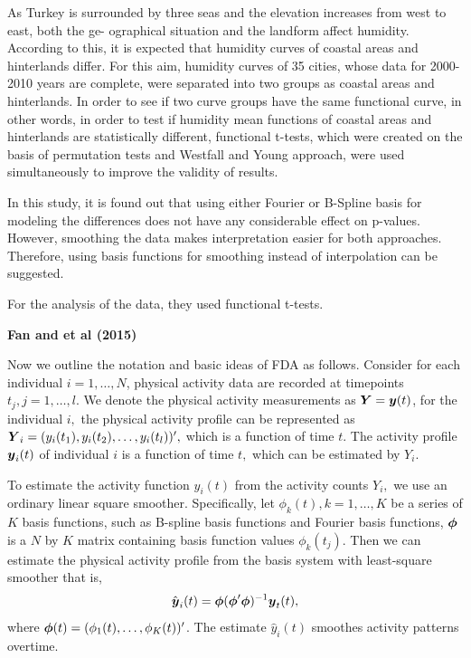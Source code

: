 \documentclass[12pt]{article}
\newcommand{\bphi}{\mbox{\boldmath$\phi$}}
\newcommand{\by}{\mbox{\boldmath$y$}}
\newcommand{\bY}{\mbox{\boldmath$Y$}}
\begin{document}
    As Turkey is surrounded by three seas and the elevation increases from west to east,
    both the ge- ographical situation and the landform affect humidity. According to this,
    it is expected that humidity curves of coastal areas and hinterlands differ. For this aim,
    humidity curves of 35 cities, whose data for 2000-2010 years are complete, were separated
    into two groups as coastal areas and hinterlands. In order to see if two curve groups have
    the same functional curve, in other words, in order to test if humidity mean functions of
    coastal areas and hinterlands are statistically different, functional t-tests, which were
    created on the basis of permutation tests and Westfall and Young approach, were used
    simultaneously to improve the validity of results.

    In this study, it is found out that using either Fourier or B-Spline basis for modeling the
     differences does not have any considerable effect on p-values. However, smoothing the data
     makes interpretation easier for both approaches. Therefore, using basis functions for
     smoothing instead of interpolation can be suggested.

    For the analysis of the data, they used functional t-tests.

    \textbf{Fan and et al (2015)}

    Now we outline the notation and basic ideas of FDA as follows. Consider for each individual $i=1,\dots ,N$,
     physical activity data are recorded at timepoints $t_j,j=1,\dots,l.$ We denote the physical activity
     measurements as $\bY=\by(t)$, for the individual $i,$ the physical activity profile can be represented as
     $\bY_i=(y_i (t_1 ),y_i (t_2 ),\ldots ,y_i (t_l ))',$ which is a function of time $t.$ The activity profile
     $\by_i(t)$ of individual $i$ is a function of time $t,$ which can be estimated by $Y_i.$

    To estimate the activity function $y_i(t)$ from the activity counts $Y_i,$ we use an ordinary linear
     square smoother. Specifically, let $ \phi_k(t), k=1,\dots,K$ be a series of $K$ basis functions,
     such as B-spline basis functions and Fourier basis functions, $\bphi$ is a $N$ by $K$ matrix containing
     basis function values $\phi _k (t_j )$. Then we can estimate the physical activity profile from the
     basis system with least-square smoother that is,
    \[ \hat{\by}_i(t) = \bphi (\bphi' \bphi)^{-1} \by_t(t),\]
    where $\bphi(t) = (\phi_1(t),\dots,\phi_K(t))'$. The estimate $\hat{y}_i(t)$ smoothes activity patterns overtime.
\end{document}
